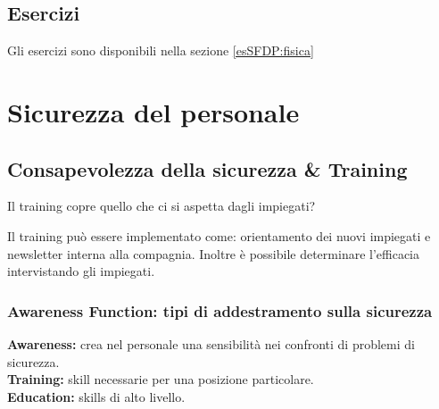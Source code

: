 \subsection{Esercizi}

Gli esercizi sono disponibili nella sezione \ref{esSFDP:fisica}

\section{Sicurezza del personale}

\subsection{Consapevolezza della sicurezza \& Training}

Il training copre quello che ci si aspetta dagli impiegati?

Il training può essere implementato come: orientamento dei nuovi impiegati e
newsletter interna alla compagnia. Inoltre è possibile determinare l'efficacia
intervistando gli impiegati.


\subsubsection{Awareness Function: tipi di addestramento sulla sicurezza}

\textbf{Awareness:} crea nel personale una sensibilità nei confronti di problemi di
sicurezza.\\
\newline
\textbf{Training:} skill necessarie per una posizione particolare.\\
\newline
\textbf{Education:} skills di alto livello.\\
